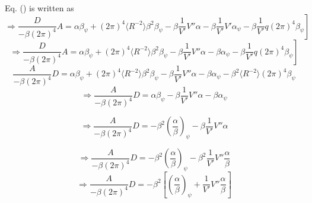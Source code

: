 \documentclass{llncs}
\begin{document}
Eq. () is written as
\begin{equation}
  \left. \Longrightarrow \frac{D}{- \beta (2 \pi)^4} A = \alpha \beta_{\psi} +
  (2 \pi)^4 \langle R^{- 2} \rangle \beta^2 \beta_{\psi} - \beta \frac{1}{V'}
  V'' \alpha - \beta \frac{1}{V'} V' \alpha_{\psi} - \beta \frac{1}{V'} q (2
  \pi)^4 \beta_{\psi} \right]
\end{equation}
\begin{equation}
  \left. \Longrightarrow \frac{D}{- \beta (2 \pi)^4} A = \alpha \beta_{\psi} +
  (2 \pi)^4 \langle R^{- 2} \rangle \beta^2 \beta_{\psi} - \beta \frac{1}{V'}
  V'' \alpha - \beta \alpha_{\psi} - \beta \frac{1}{V'} q (2 \pi)^4
  \beta_{\psi} \right]
\end{equation}
\begin{equation}
  \frac{A}{- \beta (2 \pi)^4} D = \alpha \beta_{\psi} + (2 \pi)^4 \langle R^{-
  2} \rangle \beta^2 \beta_{\psi} - \beta \frac{1}{V'} V'' \alpha - \beta
  \alpha_{\psi} - \beta^2 \langle R^{- 2} \rangle (2 \pi)^4 \beta_{\psi}
\end{equation}
\begin{equation}
  \Longrightarrow \frac{A}{- \beta (2 \pi)^4} D = \alpha \beta_{\psi} - \beta
  \frac{1}{V'} V'' \alpha - \beta \alpha_{\psi}
\end{equation}

\begin{equation}
  \Longrightarrow \frac{A}{- \beta (2 \pi)^4} D = - \beta^2 \left(
  \frac{\alpha}{\beta} \right)_{\psi} - \beta \frac{1}{V'} V'' \alpha
\end{equation}

\begin{equation}
  \Longrightarrow \frac{A}{- \beta (2 \pi)^4} D = - \beta^2 \left(
  \frac{\alpha}{\beta} \right)_{\psi} - \beta^2 \frac{1}{V'} V''
  \frac{\alpha}{\beta}
\end{equation}
\begin{equation}
  \Longrightarrow \frac{A}{- \beta (2 \pi)^4} D = - \beta^2 \left[ \left(
  \frac{\alpha}{\beta} \right)_{\psi} + \frac{1}{V'} V'' \frac{\alpha}{\beta}
  \right]
\end{equation}
\end{document}
